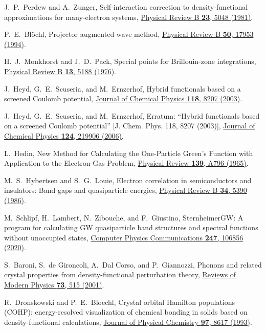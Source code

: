 \documentclass[reprint, superscriptaddress, amsmath,amssymb,prb,twocolumn]{revtex4-2}
\begin{document}
\begin{thebibliography}{116}
 J.~P.~Perdew and A.~Zunger, Self-interaction correction to density-functional approximations for many-electron systems, \href{https://doi.org/10.1103/PhysRevB.23.5048}{Physical Review B {\bf 23}, 5048 (1981)}.

 P.~E.~Bl\"{o}chl, Projector augmented-wave method, \href{https://doi.org/10.1103/PhysRevB.50.17953}{Physical Review B {\bf 50}, 17953 (1994)}.

 H.~J.~Monkhorst and J.~D.~Pack, Special points for Brillouin-zone integrations, \href{https://dx.doi.org/10.1103/PhysRevB.13.5188}{Physical Review B {\bf 13}, 5188 (1976)}.

 J.~Heyd, G.~E.~Scuseria, and M.~Ernzerhof, Hybrid functionals based on a screened Coulomb potential, \href{ https://doi.org/10.1063/1.1564060}{Journal of Chemical Physics {\bf 118}, 8207 (2003)}.

 J.~Heyd, G.~E.~Scuseria, and M.~Ernzerhof, Erratum: “Hybrid functionals based on a screened Coulomb potential” [J. Chem. Phys. 118, 8207 (2003)], \href{https://doi.org/10.1063/1.2204597}{Journal of Chemical Physics {\bf 124}, 219906 (2006)}.

 L.~Hedin, New Method for Calculating the One-Particle Green's Function with Application to the Electron-Gas Problem, \href{https://doi.org/10.1103/PhysRev.139.A796}{Physical Review {\bf 139}, A796 (1965)}.

 M.~S.~Hybertsen and S.~G.~Louie, Electron correlation in semiconductors and insulators: Band gaps and quasiparticle energies, \href{https://doi.org/10.1103/PhysRevB.34.5390}{Physical Review B {\bf 34}, 5390 (1986)}.

 M.~Schlipf, H.~Lambert, N.~Zibouche, and F.~Giustino, SternheimerGW: A program for calculating GW quasiparticle band structures and spectral functions without unoccupied states, \href{https://doi.org/10.1016/j.cpc.2019.07.019}{Computer Physics Communications {\bf 247}, 106856 (2020)}.

 S.~Baroni, S.~de Gironcoli, A.~Dal Corso, and P.~Giannozzi, Phonons and related crystal properties from density-functional perturbation theory, \href{https://dx.doi.org/10.1103/RevModPhys.73.515}{Reviews of Modern Physics {\bf 73}, 515 (2001)}.

 R.~Dronskowski and P.~E.~Bloechl, Crystal orbital Hamilton populations (COHP): energy-resolved visualization of chemical bonding in solids based on density-functional calculations, \href{https://doi.org/10.1021/j100135a014}{Journal of Physical Chemistry {\bf 97}, 8617 (1993)}.


\end{thebibliography}
\end{document}
